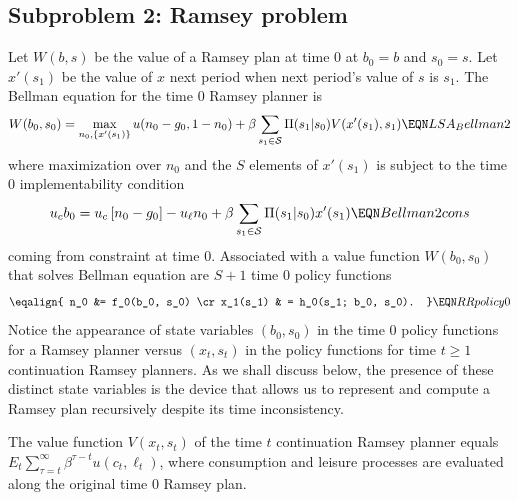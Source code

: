 \subsection{Subproblem 2:  Ramsey problem}
 Let $W(b, s)$ be the value of a Ramsey plan at time $0$ at $b_0=b$ and $s_0 = s$.
Let $x'(s_1)$ be the value of $x$ next period when next period's value of $s$ is $s_1$.
The Bellman equation for the time $0$ Ramsey planner is %
$$ W(b_0, s_0) = \max_{n_0, \{x'(s_1)\}} u(n_0 - g_0, 1 - n_0) + \beta \sum_{s_1 \in {\cal S}} \Pi(s_1| s_0) V( x'(s_1), s_1)  \EQN LSA_Bellman2 $$
where  maximization over $n_0$ and the $S $ elements of $x'(s_1)$ is subject to the time $0$ implementability condition
$$   u_{c} b_0 = u_{c} \left[n_0 - g_0\right] - u_{\ell} n_0  + \beta \sum_{s_1\in {\cal S}} \Pi(s_1 | s_0) x'(s_1) \EQN Bellman2cons $$
coming from constraint  at time $0$.
Associated with a value function $W(b_0, s_0)$ that solves Bellman equation  are $S +1 $
time $0$ policy functions
$$ \eqalign{ n_0 &= f_0(b_0, s_0) \cr
             x_1(s_1) & = h_0(s_1; b_0, s_0). } \EQN RRpolicy0 $$
Notice the appearance of  state variables $(b_0, s_0)$ in the time $0$ policy functions
 for a Ramsey planner versus  $(x_t, s_t)$ in the policy functions  for   time $t \geq 1$ continuation  Ramsey planners.
As we shall discuss below, the presence of these distinct state variables is the device that allows
us to represent and compute a  Ramsey plan  recursively despite its  time inconsistency.
%
%
%



 The value function $V(x_t, s_t)$ of the time $t$ continuation Ramsey planner   equals
$E_t \sum_{\tau = t}^\infty \beta^{\tau - t} u(c_t, \ell_t)$, where  consumption and leisure processes are evaluated along the original time $0$ Ramsey plan.





